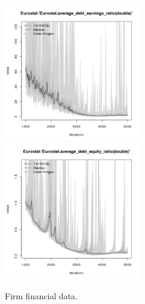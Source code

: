 \begin{figure}[H!]
\begin{minipage}{14cm}
\includegraphics[width=6cm]{./png/tax_0.10/Eurostat-average_debt_earnings_ratio.png}
\includegraphics[width=6cm]{./png/tax_0.10/Eurostat-average_debt_equity_ratio.png}
\end{minipage}
\caption{Firm financial data.}
\label{Figure: Firm Financial Data}
\end{figure}


